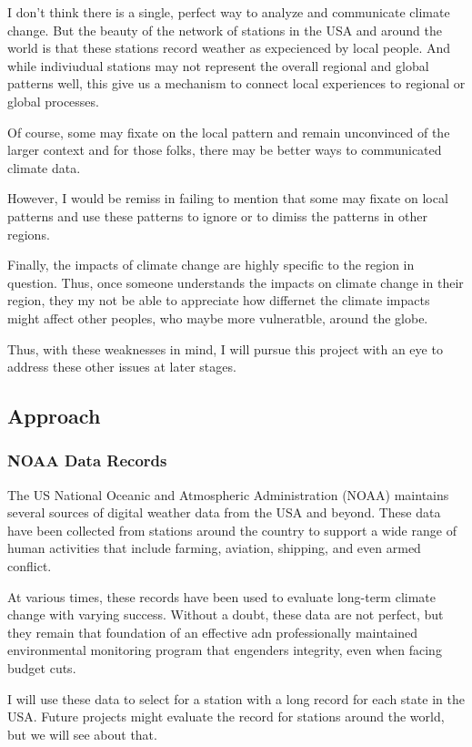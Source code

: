 \documentclass{article}\usepackage[]{graphicx}\usepackage[]{xcolor}
\begin{document}
I don't think there is a single, perfect way to analyze and communicate climate change. But the beauty of the network of stations in the USA and around the world is that these stations record weather as expecienced by local people. And while indiviudual stations may not represent the overall regional and global patterns well, this give us a mechanism to connect local experiences to regional or global processes. 

Of course, some may fixate on the local pattern and remain unconvinced of the larger context and for those folks, there may be better ways to communicated climate data. 

However, I would be remiss in failing to mention that some may fixate on local patterns and use these patterns to ignore or to dimiss the patterns in other regions. 

Finally, the impacts of climate change are highly specific to the region in question. Thus, once someone understands the impacts on climate change in their region, they my not be able to appreciate how differnet the climate impacts might affect other peoples, who maybe more vulneratble, around the globe. 

Thus, with these weaknesses in mind, I will pursue this project with an eye to address these other issues at later stages.

\subsection{Approach}

\subsubsection{NOAA Data Records}

The US National Oceanic and Atmospheric Administration (NOAA) maintains several sources of digital weather data from the USA and beyond. These data have been collected from stations around the country to support a wide range of human activities that include farming, aviation, shipping, and even armed conflict. 

At various times, these records have been used to evaluate long-term climate change with varying success. Without a doubt, these data are not perfect, but they remain that foundation of an effective adn professionally maintained environmental monitoring program that engenders integrity, even when facing budget cuts. 

I will use these data to select for a station with a long record for each state in the USA. Future projects might evaluate the record for stations around the world, but we will see about that. 
\end{document}

